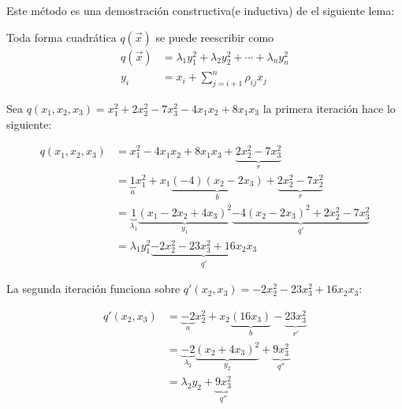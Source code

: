Este método es una demostración constructiva(e inductiva) de el siguiente lema:

\begin{lemma}
Toda forma cuadrática $q\left(\overrightarrow{x}\right)$ se puede reescribir como
\begin{equation}
\begin{split}
q\left(\overrightarrow{x}\right) & =\lambda_{1}y_{1}^{2} + \lambda_{2}y_{2}^{2} + \cdots + \lambda_{n}y_{n}^{2}\\
y_{i} & = x_{i} + \sum_{j=i+1}^{n}\rho_{ij}x_{j}
\end{split}
\label{ecuacion:2.3}
\end{equation}
\label{lema:2.3}
\end{lemma}

\begin{example}

 Sea $q\left(x_{1}, x_{2}, x_{3}\right) = x_{1}^{2} + 2x_{2}^{2} - 7x_{3}^{2} - 4x_{1}x_{2} + 8x_{1}x_{3}$ la primera iteración hace lo siguiente:
 
 \begin{equation*}
\begin{split}
q\left(x_{1}, x_{2}, x_{3}\right) & = x_{1}^{2} - 4x_{1}x_{2} + 8x_{1}x_{3} +  \underbrace{2x_{2}^{2} - 7x_{3}^{2}}_{r}\\
 & = \underbrace{1}_{a}x_{1}^{2} + x_{1} \underbrace{\left(-4\right)\left(x_{2} - 2x_{3}\right)}_{b} + \underbrace{2x_{2}^{2} - 7x_{2}^{2}}_{r}\\
 & = \underbrace{1}_{\lambda_{1}} \underbrace{\left(x_{1} - 2x_{2} + 4x_{3}\right)^{2}}_{y_{1}} \underbrace{- 4\left(x_{2} - 2x_{3}\right)^{2} + 2x_{2}^{2} - 7x_{3}^{2}}_{q'}\\
 & = \lambda_{1}y_{1}^{2} \underbrace{- 2x_{2}^{2} - 23x_{3}^{2} + 16x_{2}x_{3}}_{q'}
\end{split}
\end{equation*}

La segunda iteración funciona sobre $q'\left(x_{2}, x_{3} \right) = -2x_{2}^{2} - 23x_{3}^{2} + 16x_{2}x_{3}$:

\begin{equation*}
\begin{split}
q'\left(x_{2}, x_{3}\right) & = \underbrace{-2}_{a}x_{2}^{2} + x_{2}\underbrace{\left(16x_{3}\right)}_{b} - \underbrace{23x_{3}^{2}}_{r'}\\
 & = \underbrace{-2}_{\lambda_{2}}\underbrace{\left(x_{2} + 4x_{3}\right)^{2}}_{y_{2}} + \underbrace{9x_{3}^{2}}_{q''}\\
 & = \lambda_{2}y_{2} + \underbrace{9x_{3}^{2}}_{q''}
\end{split}
\end{equation*}


\end{example}
